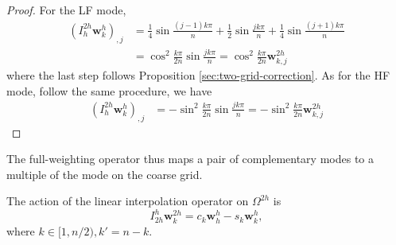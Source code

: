 \begin{proof}
  For the LF mode,
  \begin{equation*}
    \begin{aligned}
      (I^{2h}_h\mathbf{w}^h_{k})_{,j}&=
      \frac{1}{4}\sin\frac{(j-1)k\pi}{n}
      +\frac{1}{2}\sin\frac{jk\pi}{n}
      +\frac{1}{4}\sin\frac{(j+1)k\pi}{n}\\
     & =\cos^2\frac{k\pi}{2n}\sin\frac{jk\pi}{n}
      =\cos^2\frac{k\pi}{2n}\mathbf{w}^{2h}_{k,j}
    \end{aligned}
  \end{equation*}
  where the last step follows Proposition \ref{sec:two-grid-correction}.
  As for the HF mode,
  follow the same procedure,
  we have
    \begin{equation*}
    \begin{aligned}
      (I^{2h}_h\mathbf{w}^h_{k})_{,j}&=
      -\sin^2\frac{k\pi}{2n}\sin\frac{jk\pi}{n}
      =-\sin^2\frac{k\pi}{2n}\mathbf{w}^{2h}_{k,j}
    \end{aligned}
  \end{equation*}
\end{proof}

\begin{rem}
  The full-weighting operator thus maps a pair of complementary modes
  to a multiple of the mode on the coarse grid.
\end{rem}

\begin{lem}
  The action of the linear interpolation operator on $\Omega^{2h}$ is
  \begin{equation}
    I^h_{2h}\mathbf{w}_k^{2h}=c_k\mathbf{w}^h_h-s_k\mathbf{w}^h_k,
  \end{equation}
where $k\in [1,n/2),k'=n-k.$
\end{lem}

